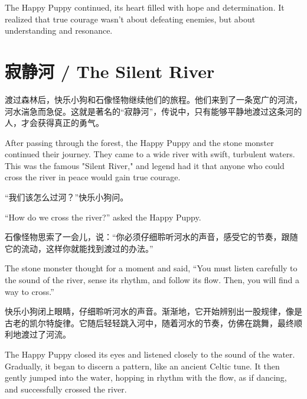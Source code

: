 \begin{flushright}
The Happy Puppy continued, its heart filled with hope and determination. It realized that true courage wasn’t about defeating enemies, but about understanding and resonance.
\end{flushright}

\section*{寂静河 / The Silent River}

渡过森林后，快乐小狗和石像怪物继续他们的旅程。他们来到了一条宽广的河流，河水湍急而急促。这就是著名的“寂静河”，传说中，只有能够平静地渡过这条河的人，才会获得真正的勇气。

\begin{flushright}
After passing through the forest, the Happy Puppy and the stone monster continued their journey. They came to a wide river with swift, turbulent waters. This was the famous "Silent River," and legend had it that anyone who could cross the river in peace would gain true courage.
\end{flushright}

“我们该怎么过河？”快乐小狗问。

\begin{flushright}
“How do we cross the river?” asked the Happy Puppy.
\end{flushright}

石像怪物思索了一会儿，说：“你必须仔细聆听河水的声音，感受它的节奏，跟随它的流动，这样你就能找到渡过的办法。”

\begin{flushright}
The stone monster thought for a moment and said, “You must listen carefully to the sound of the river, sense its rhythm, and follow its flow. Then, you will find a way to cross.”
\end{flushright}

快乐小狗闭上眼睛，仔细聆听河水的声音。渐渐地，它开始辨别出一股规律，像是古老的凯尔特旋律。它随后轻轻跳入河中，随着河水的节奏，仿佛在跳舞，最终顺利地渡过了河流。

\begin{flushright}
The Happy Puppy closed its eyes and listened closely to the sound of the water. Gradually, it began to discern a pattern, like an ancient Celtic tune. It then gently jumped into the water, hopping in rhythm with the flow, as if dancing, and successfully crossed the river.
\end{flushright}

